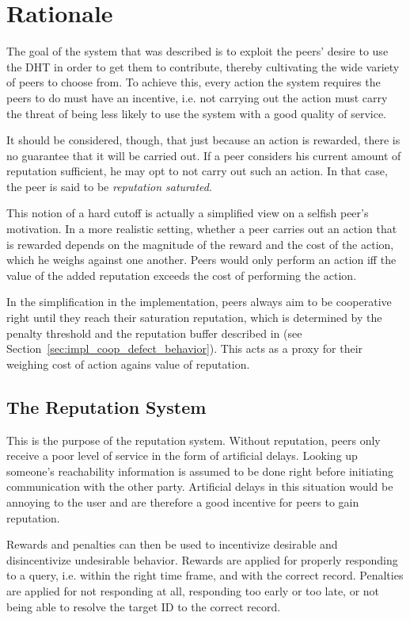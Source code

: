\section{Rationale}
\label{sec:desc_rationale}
The goal of the system that was described is to exploit the peers' desire to use
the DHT in order to get them to contribute, thereby cultivating the wide variety
of peers to choose from. To achieve this, every action the system requires the
peers to do must have an incentive, i.e. not carrying out the action must carry
the threat of being less likely to use the system with a good quality of
service.

It should be considered, though, that just because an action is rewarded, there
is no guarantee that it will be carried out. If a peer considers his current
amount of reputation sufficient, he may opt to not carry out such an action. In
that case, the peer is said to be \emph{reputation saturated}.

This notion of a hard cutoff is actually a simplified view on a selfish peer's
motivation. In a more realistic setting, whether a peer carries out an action
that is rewarded depends on the magnitude of the reward and the cost of the
action, which he weighs against one another. Peers would only perform an action
iff the value of the added reputation exceeds the cost of performing the action.

In the simplification in the implementation, peers always aim to be cooperative
right until they reach their saturation reputation, which is determined by the
penalty threshold and the reputation buffer described in (see
Section~\ref{sec:impl_coop_defect_behavior}). This acts as a proxy for their
weighing cost of action agains value of reputation.

\subsection{The Reputation System}
\label{sec:desc_rep_system}
This is the purpose of the reputation system. Without reputation, peers only
receive a poor level of service in the form of artificial delays. Looking up
someone's reachability information is assumed to be done right before initiating
communication with the other party. Artificial delays in this situation would be
annoying to the user and are therefore a good incentive for peers to gain
reputation.

Rewards and penalties can then be used to incentivize desirable and
disincentivize undesirable behavior. Rewards are applied for properly responding
to a query, i.e. within the right time frame, and with the correct record.
Penalties are applied for not responding at all, responding too early or too
late, or not being able to resolve the target ID to the correct record.

